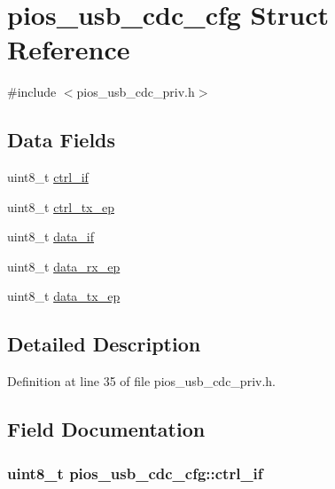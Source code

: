 \hypertarget{structpios__usb__cdc__cfg}{\section{pios\-\_\-usb\-\_\-cdc\-\_\-cfg \-Struct \-Reference}
\label{structpios__usb__cdc__cfg}
}


{\ttfamily \#include $<$pios\-\_\-usb\-\_\-cdc\-\_\-priv.\-h$>$}

\subsection*{\-Data \-Fields}
\begin{DoxyCompactItemize}
\item 
uint8\-\_\-t \hyperlink{structpios__usb__cdc__cfg_a2a35b38ff91a638b973191977eab30e1}{ctrl\-\_\-if}
\item 
uint8\-\_\-t \hyperlink{structpios__usb__cdc__cfg_a66e87c604aa767dc74141a0b7e7e3b7f}{ctrl\-\_\-tx\-\_\-ep}
\item 
uint8\-\_\-t \hyperlink{structpios__usb__cdc__cfg_a6812747b57d5aa880ba1c3bde8f6333c}{data\-\_\-if}
\item 
uint8\-\_\-t \hyperlink{structpios__usb__cdc__cfg_a93c34c9365c4f3593572f3c75039dc3c}{data\-\_\-rx\-\_\-ep}
\item 
uint8\-\_\-t \hyperlink{structpios__usb__cdc__cfg_a00440e0eaec6a2c120fd8909599e8f61}{data\-\_\-tx\-\_\-ep}
\end{DoxyCompactItemize}


\subsection{\-Detailed \-Description}


\-Definition at line 35 of file pios\-\_\-usb\-\_\-cdc\-\_\-priv.\-h.



\subsection{\-Field \-Documentation}
\hypertarget{structpios__usb__cdc__cfg_a2a35b38ff91a638b973191977eab30e1}{
\subsubsection[{ctrl\-\_\-if}]{\setlength{\rightskip}{0pt plus 5cm}uint8\-\_\-t {\bf pios\-\_\-usb\-\_\-cdc\-\_\-cfg\-::ctrl\-\_\-if}}}\label{structpios__usb__cdc__cfg_a2a35b38ff91a638b973191977eab30e1}


